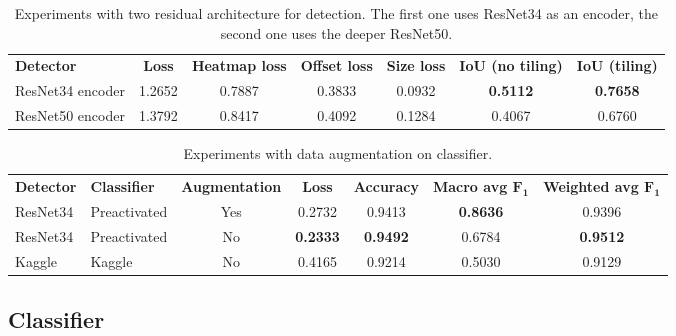 \begin{table*}
	\begin{tabular}{lcccccc}
		\rowcolor[HTML]{EFEFEF} 
		\textbf{Detector}   & \textbf{Loss} & \textbf{Heatmap loss} & \textbf{Offset loss} & \textbf{Size loss} & \textbf{IoU (no tiling)} & \textbf{IoU (tiling)} \\
		ResNet34 encoder      & 1.2652        & 0.7887                & 0.3833               & 0.0932             & \textbf{0.5112}                   & \textbf{0.7658}                \\
		ResNet50 encoder      & 1.3792        & 0.8417                & 0.4092               & 0.1284             & 0.4067                   & 0.6760
	\end{tabular}
	\caption{Experiments with two residual architecture for detection. The first one uses ResNet34 as an encoder, the second one uses the deeper ResNet50.}
	\label{tab:expdetector}
\end{table*}

\begin{table*}
	\begin{tabular}{llccccc}
		\rowcolor[HTML]{EFEFEF} 
		\textbf{Detector} & \textbf{Classifier} & \textbf{Augmentation} & \textbf{Loss} & \textbf{Accuracy} & \textbf{Macro avg $\mathbf{F_1}$} & \textbf{Weighted avg $\mathbf{F_1}$} \\
		ResNet34          & Preactivated        & Yes                   & 0.2732        & 0.9413  & \textbf{0.8636} & 0.9396     \\
		ResNet34          & Preactivated        & No                    & \textbf{0.2333}        &  \textbf{0.9492} & 0.6784    & \textbf{0.9512}           \\
		Kaggle          & Kaggle    & No                   & 0.4165           & 0.9214     & 0.5030 & 0.9129         
	\end{tabular}
	\caption{Experiments with data augmentation on classifier.}
	\label{tab:classres}
\end{table*}

\subsection{Classifier}
\label{ssec:classifierexp}

